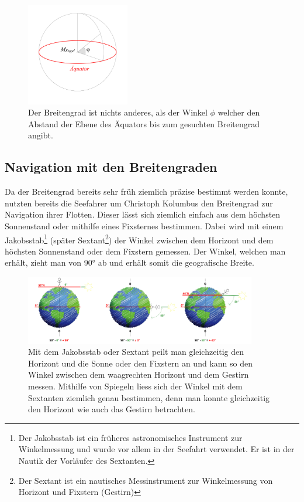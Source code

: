 \begin{refsection}
\begin{figure}[hbtp]
\centering
\includegraphics[width=0.4\textwidth]{kugel/GeografischeBreite.jpg}
\caption{Der Breitengrad ist nichts anderes, als der Winkel $\phi$ welcher den Abstand der Ebene des Äquators bis zum gesuchten Breitengrad angibt.}
\end{figure}

\subsection{Navigation mit den Breitengraden}  \label{BreitengradM}
Da der Breitengrad bereits sehr früh ziemlich präzise bestimmt werden konnte, nutzten bereits die Seefahrer um Christoph Kolumbus den Breitengrad zur Navigation ihrer Flotten.
Dieser lässt sich ziemlich einfach aus dem höchsten Sonnenstand oder mithilfe eines Fixsternes bestimmen. Dabei wird mit einem Jakobsstab\footnote{%
Der Jakobsstab ist ein früheres astronomisches Instrument zur Winkelmessung und wurde vor allem in der Seefahrt verwendet. Er ist in der Nautik der Vorläufer des Sextanten.} (später Sextant\footnote{%
Der Sextant ist ein nautisches Messinstrument zur Winkelmessung von Horizont und Fixstern (Gestirn)}) der Winkel zwischen dem Horizont und dem höchsten Sonnenstand oder dem Fixstern gemessen. Der Winkel, welchen man erhält, zieht man von 90° ab und erhält somit die geografische Breite. 

\begin{figure}[htbp]
\centering
\includegraphics[width=0.9\textwidth]{kugel/Breitengrad.jpg}
\caption{Mit dem Jakobsstab oder Sextant peilt man gleichzeitig den Horizont und die Sonne oder den Fixstern an und kann so den Winkel zwischen dem waagrechten Horizont und dem Gestirn messen. Mithilfe von Spiegeln liess sich der Winkel mit dem Sextanten ziemlich genau bestimmen, denn man konnte gleichzeitig den Horizont wie auch das Gestirn betrachten.}
\end{figure}


\end{refsection}
